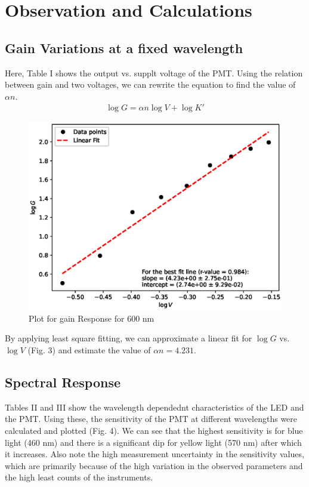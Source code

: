 \section{Observation and Calculations}

\subsection{Gain Variations at a fixed wavelength}
Here, Table I shows the output vs. supplt voltage of the PMT. Using the relation between gain and two voltages, we can rewrite the equation to find the value of $\alpha n$.
\begin{align*}
    \log G = \alpha n \log V + \log K'
\end{align*}



\begin{figure}[H]
    \centering
    \includegraphics[width=1\columnwidth]{images/gain.eps}
    \caption{Plot for gain Response for 600 nm}
    \label{g1}
\end{figure}

By applying least square fitting, we can approximate a linear fit for $\log G$ vs. $\log V$ (Fig. 3) and estimate the value of $\alpha n = 4.231$.
\vspace{-2em}
\subsection{Spectral Response}

Tables II and III show the wavelength dependednt characteristics of the LED and the PMT. Using these, the sensitivity of the PMT at different wavelengths were calculated and plotted (Fig. 4). We can see that the highest sensitivity is for blue light (460 nm) and there is a significant dip for yellow light (570 nm) after which it increases.
Also note the high measurement uncertainty in the sensitivity values, which are primarily because of the high variation in the observed parameters and the high least counts of the instruments.

